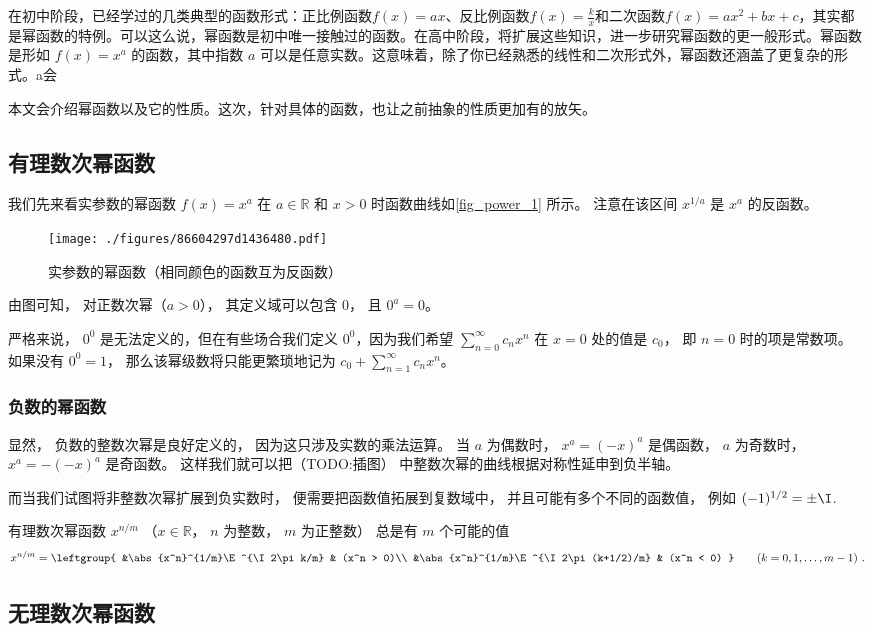 
在初中阶段，已经学过的几类典型的函数形式：正比例函数$f(x) = ax$、反比例函数$f(x) = \frac{k}{x}$和二次函数$f(x) = ax^2+bx+c$，其实都是幂函数的特例。可以这么说，幂函数是初中唯一接触过的函数。在高中阶段，将扩展这些知识，进一步研究幂函数的更一般形式。幂函数是形如 $f(x) = x^a$ 的函数，其中指数 $a$ 可以是任意实数。这意味着，除了你已经熟悉的线性和二次形式外，幂函数还涵盖了更复杂的形式。a会

本文会介绍幂函数以及它的性质。这次，针对具体的函数，也让之前抽象的性质更加有的放矢。


\subsection{有理数次幂函数}
我们先来看实参数的幂函数 $f(x) = x^a$ 在 $a\in\mathbb R$ 和 $x > 0$ 时函数曲线如\autoref{fig_power_1} 所示。 注意在该区间 $x^{1/a}$ 是 $x^a$ 的反函数。

\begin{figure}[ht]
\centering
\texttt{[image: ./figures/86604297d1436480.pdf]}
\caption{实参数的幂函数（相同颜色的函数互为反函数）}\label{fig_power_1}
\end{figure}

由图可知， 对正数次幂（$a > 0$）， 其定义域可以包含 $0$， 且 $0^a = 0$。

严格来说， $0^0$ 是无法定义的，但在有些场合我们定义 $0^0$，因为我们希望 $\sum_{n=0}^\infty c_n x^n$ 在 $x = 0$ 处的值是 $c_0$， 即 $n=0$ 时的项是常数项。 如果没有 $0^0 = 1$， 那么该幂级数将只能更繁琐地记为 $c_0 + \sum_{n=1}^\infty c_n x^n$。

\subsubsection{负数的幂函数}
显然， 负数的整数次幂是良好定义的， 因为这只涉及实数的乘法运算。 当 $a$ 为偶数时， $x^a = (-x)^a$ 是偶函数， $a$ 为奇数时， $x^a = -(-x)^a$ 是奇函数。 这样我们就可以把（TODO:插图） 中整数次幂的曲线根据对称性延申到负半轴。

而当我们试图将非整数次幂扩展到负实数时， 便需要把函数值拓展到复数域中， 并且可能有多个不同的函数值， 例如 $(-1)^{1/2} = \pm\I$. 

有理数次幂函数 $x^{n/m}$ （$x\in \mathbb R$， $n$ 为整数， $m$ 为正整数） 总是有 $m$ 个可能的值
\begin{equation}
x^{n/m} = \leftgroup{
&\abs{x^n}^{1/m}\E^{\I 2\pi k/m} & (x^n > 0)\\
&\abs{x^n}^{1/m}\E^{\I 2\pi (k+1/2)/m} & (x^n < 0)
}\qquad (k = 0,1,\dots, m-1)~.
\end{equation}

\subsection{无理数次幂函数}
